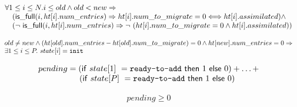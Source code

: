 \begin{lemma}
  \begin{equation*}
    \begin{array}{l}
    \forall 1 \leq i \leq N. i \leq old \wedge old < new \Rightarrow  \\
    \quad (\mathsf{is\_full}(i, \mbox{$ht[i]$}.num\_entries) \Rightarrow \mbox{$ht[i]$}.num\_to\_migrate = 0 \Longleftrightarrow \mbox{$ht[i]$}.assimilated) \wedge \\
    \quad (\mbox{$\neg\ \mathsf{is\_full}(i, \mbox{$ht[i]$}.num\_entries)$} \Rightarrow \mbox{$\neg\ (\mbox{$ht[i]$}.num\_to\_migrate = 0 \wedge \mbox{$ht[i]$}.assimilated)$})
    \end{array}
  \end{equation*}
  \label{num_to_migrate_and_assimilated_in_old_tables}  
\end{lemma}  

\begin{lemma}
  \begin{equation*}
    \begin{array}{l}
      old \neq new \wedge (\mbox{$ht[old]$}.num\_entries - \mbox{$ht[old]$}.num\_to\_migrate) = 0 \wedge \mbox{$ht[new]$}.num\_entries = 0 \Rightarrow \\
      \exists 1 \leq i \leq P.~state[i] = \mbox{\texttt{init}}
    \end{array}
  \end{equation*}
  \label{one_thread_at_init_state_after_migration}
\end{lemma}


\begin{lemma}
  \begin{equation*}
\begin{array}{l}        
  pending = (\mathsf{if}~state[1]~=\mbox{\texttt{ready-to-add}}~ \mathsf{then}~1~\mathsf{else}~0) + \ldots + \\
   \quad \quad \quad \quad \quad (\mathsf{if}~state[P]~= \mbox{\texttt{ready-to-add}}~ \mathsf{then}~1~\mathsf{else}~0)
\end{array}
\end{equation*}  
  \label{pending}
\end{lemma}  

\begin{lemma}
  \begin{equation*}
\begin{array}{l}        
  pending \geq 0
\end{array}
\end{equation*}  
  \label{pending_lb}
\end{lemma}  


